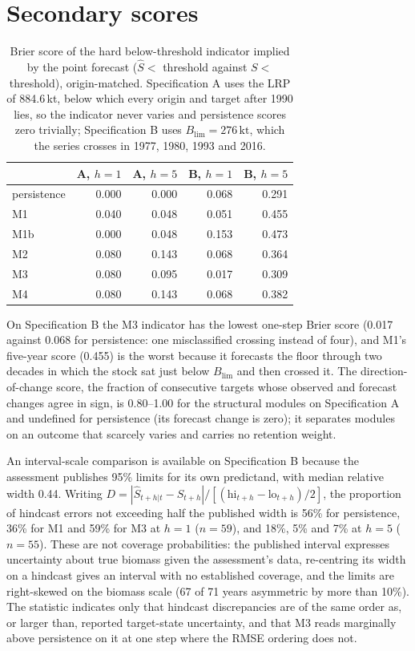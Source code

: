 \documentclass[preprint,11pt,authoryear]{elsarticle}
\theoremstyle{remark}
\newcommand{\kt}{\,\mathrm{kt}}
\newcommand{\Blim}{B_{\mathrm{lim}}}
\begin{document}
\FloatBarrier
\section{Secondary scores}\label{si:secondary}

\begin{table}[!htb]
\centering\small
\caption{Brier score of the hard below-threshold indicator implied by the point forecast ($\hat S < $ threshold against $S <$ threshold), origin-matched. Specification A uses the LRP of 884.6\,kt, below which every origin and target after 1990 lies, so the indicator never varies and persistence scores zero trivially; Specification B uses $\Blim = 276\kt$, which the series crosses in 1977, 1980, 1993 and 2016.}
\label{tab:si_brier}
\begin{tabular}{@{}lrrrr@{}}
\toprule
 & A, $h=1$ & A, $h=5$ & B, $h=1$ & B, $h=5$ \\
\midrule
persistence & 0.000 & 0.000 & 0.068 & 0.291 \\
M1 & 0.040 & 0.048 & 0.051 & 0.455 \\
M1b & 0.000 & 0.048 & 0.153 & 0.473 \\
M2 & 0.080 & 0.143 & 0.068 & 0.364 \\
M3 & 0.080 & 0.095 & 0.017 & 0.309 \\
M4 & 0.080 & 0.143 & 0.068 & 0.382 \\
\bottomrule
\end{tabular}
\end{table}

On Specification B the M3 indicator has the lowest one-step Brier score (0.017 against 0.068 for persistence: one misclassified crossing instead of four), and M1's five-year score (0.455) is the worst because it forecasts the floor through two decades in which the stock sat just below $\Blim$ and then crossed it. The direction-of-change score, the fraction of consecutive targets whose observed and forecast changes agree in sign, is 0.80--1.00 for the structural modules on Specification A and undefined for persistence (its forecast change is zero); it separates modules on an outcome that scarcely varies and carries no retention weight.

An interval-scale comparison is available on Specification B because the assessment publishes 95\% limits for its own predictand, with median relative width 0.44. Writing $D = |\hat S_{t+h|t} - S_{t+h}| / [(\mathrm{hi}_{t+h}-\mathrm{lo}_{t+h})/2]$, the proportion of hindcast errors not exceeding half the published width is 56\% for persistence, 36\% for M1 and 59\% for M3 at $h=1$ ($n=59$), and 18\%, 5\% and 7\% at $h=5$ ($n=55$). These are not coverage probabilities: the published interval expresses uncertainty about true biomass given the assessment's data, re-centring its width on a hindcast gives an interval with no established coverage, and the limits are right-skewed on the biomass scale (67 of 71 years asymmetric by more than 10\%). The statistic indicates only that hindcast discrepancies are of the same order as, or larger than, reported target-state uncertainty, and that M3 reads marginally above persistence on it at one step where the RMSE ordering does not.
\end{document}
